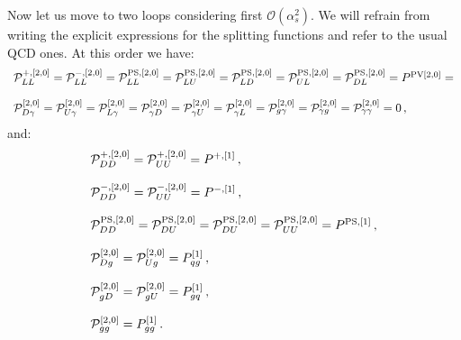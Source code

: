 \documentclass[10pt,a4paper]{article}
\begin{document}
Now let us move to two loops considering first
$\mathcal{O}(\alpha_s^2)$. We will refrain from writing the explicit
expressions for the splitting functions and refer to the usual QCD
ones. At this order we have:
\begin{equation}
\begin{array}{l}
\mathcal{P}_{LL}^{+,[2,0]}=\mathcal{P}_{LL}^{-,[2,0]}=\mathcal{P}^{\rm PS,[2,0]}_{LL}=\mathcal{P}^{\rm PS,[2,0]}_{LU}=\mathcal{P}^{\rm PS,[2,0]}_{LD}=\mathcal{P}^{\rm PS,[2,0]}_{UL}=\mathcal{P}^{\rm PS,[2,0]}_{DL}=  P^{\rm PV [2,0]}=\\
\\
\mathcal{P}_{D\gamma}^{[2,0]}=\mathcal{P}_{U\gamma}^{[2,0]}=\mathcal{P}_{L\gamma}^{[2,0]}=\mathcal{P}_{\gamma
  D}^{[2,0]}=\mathcal{P}_{\gamma U}^{[2,0]}=\mathcal{P}_{\gamma
  L}^{[2,0]}=\mathcal{P}_{g\gamma}^{[2,0]}=\mathcal{P}_{\gamma
  g}^{[2,0]}=\mathcal{P}_{\gamma\gamma}^{[2,0]}=0\,,
\end{array}
\end{equation}
and:
\begin{equation}
\begin{array}{l}
\displaystyle
  \mathcal{P}_{DD}^{+,[2,0]}=\mathcal{P}_{UU}^{+,[2,0]}= P^{+,[1]}\,,\\
\\
\mathcal{P}_{DD}^{-,[2,0]}=\mathcal{P}_{UU}^{-,[2,0]} = P^{-,[1]}\,,\\
\\
\mathcal{P}^{\rm PS,[2,0]}_{DD}=\mathcal{P}^{\rm PS,[2,0]}_{DU}=\mathcal{P}^{\rm  PS,[2,0]}_{DU}=\mathcal{P}^{\rm  PS,[2,0]}_{UU}= P^{\rm PS,[1]}\,,\\
\\
\displaystyle \mathcal{P}_{Dg}^{[2,0]}=\mathcal{P}_{Ug}^{[2,0]}=P_{qg}^{[1]}\,,\\
\\
\displaystyle \mathcal{P}_{gD}^{[2,0]}=\mathcal{P}_{gU}^{[2,0]}=P_{gq}^{[1]}\,,\\
\\
\displaystyle \mathcal{P}_{gg}^{[2,0]}=P_{gg}^{[1]}\,.
\end{array}
\end{equation}
\end{document}
